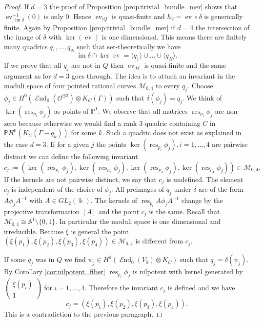 \documentclass[12pt]{extarticle}
\theoremstyle{definition}
\numberwithin{theorem}{section}
\newcommand{\PP}{\mathbb{P}}
\newcommand{\Aff}{\mathbb{A}}
\newcommand{\cM}{\mathcal{M}}
\newcommand{\OO}{\mathcal{O}}
\newcommand{\op}{\operatorname}
\DeclareMathOperator{\End}{\mathcal{E}nd}
\begin{document}
\begin{proof}
If $d = 3$ the proof of Proposition \ref{prop:trivial_bundle_mer} shows that $\op{ev}^{-1}_{|\op{im}\delta}(0)$ is only $0$. Hence $\op{ev}_{|Q}$ is quasi-finite and $h_V = \op{ev} \circ \delta$ is generically finite. 
Again by Proposition \ref{prop:trivial_bundle_mer} if $d = 4$ the intersection of the image of $\delta$ with $\ker(\op{ev})$ is one dimensional. This means there are finitely many quadrics $q_1,\ldots,q_N$ such that set-theoretically we have
\begin{equation*}
\op{im} \delta\cap \ker \op{ev} = \langle q_1\rangle \cup \ldots \cup \langle q_N \rangle.
\end{equation*}
If we prove that all $q_j$ are not in $Q$ then $\op{ev}_{|Q}$ is quasi-finite and the same argument as for $d = 3$ goes through. The idea is to attach an invariant in the moduli space of four pointed rational curves $\cM_{0,4}$ to every $q_j$. Choose $\phi_j\in H^0(\End_0(\OO^{\oplus 2}) \otimes K_C(\Gamma))$ such that $\delta(\phi_j) = q_j$. We think of $\ker(\op{res}_{p_i} \phi_j)$ as points of $\PP^1$. We observe that all matrices $\op{res}_{p_i}\phi_j$ are non-zero because otherwise we would find a rank $3$ quadric containing $C$ in $\PP H^0(K_C(\Gamma -q_k))$ for some $k$. Such a quadric does not exist as explained in the case $d = 3$. If for a given $j$ the points $\ker(\op{res}_{p_i}\phi_j), i=1,\ldots,4$ are pairwise distinct we can define the following invariant
\begin{equation*}
c_j := \left(\ker(\op{res}_{p_1} \phi_j),\ker(\op{res}_{p_2} \phi_j),\ker(\op{res}_{p_3} \phi_j),\ker(\op{res}_{p_4} \phi_j)\right) \in \cM_{0,4}.
\end{equation*}
If the kernels are not pairwise distinct, we say that $c_j$ is undefined. 
The element $c_j$ is independent of the choice of $\phi_j$: All preimages of $q_j$ under $\delta$ are of the form $A\phi_jA^{-1}$ with $A \in GL_2(\Bbbk)$. The kernels of $\op{res}_{p_i}A\phi_jA^{-1}$ change by the projective transformation $[A]$ and the point $c_j$ is the same.
Recall that $\cM_{0,4} \cong \Aff^1\setminus \{0,1\}$. In particular the moduli space is one dimensional and irreducible. Because $\xi$ is general the point $(\xi(p_1),\xi(p_2),\xi(p_3),\xi(p_4)) \in \cM_{0,4}$ is different from $c_j$. 

If some $q_j$ was in $Q$ we   find $\psi_j \in H^0(\End_0(V_0)\otimes K_C)$ such that $q_j = \delta(\psi_j)$. By Corollary \ref{cor:nilpotent_fiber} $\op{res}_{p_i}\phi_j$ is nilpotent with kernel generated by $ \begin{pmatrix}
 \xi(p_i) \\ 1 
\end{pmatrix}  $ for $i=1,\ldots,4$. Therefore the invariant $c_j$ is defined and we have 
\begin{equation*}
	c_j = (\xi(p_1),\xi(p_2),\xi(p_3),\xi(p_4)).
\end{equation*}
This is a contradiction to the previous paragraph.
\end{proof}
\end{document}
